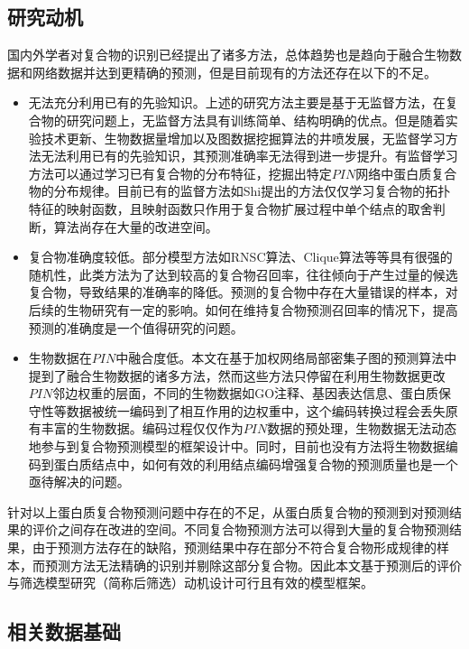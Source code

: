 \subsection{研究动机}
\label{subsection:motivationAndThinking:motivation}
国内外学者对复合物的识别已经提出了诸多方法，总体趋势也是趋向于融合生物数据和网络数据并达到更精确的预测，但是目前现有的方法还存在以下的不足。
\begin{itemize}
  \item 无法充分利用已有的先验知识。上述的研究方法主要是基于无监督方法，在复合物的研究问题上，无监督方法具有训练简单、结构明确的优点。但是随着实验技术更新、生物数据量增加以及图数据挖掘算法的井喷发展，无监督学习方法无法利用已有的先验知识，其预测准确率无法得到进一步提升。有监督学习方法可以通过学习已有复合物的分布特征，挖掘出特定$PIN$网络中蛋白质复合物的分布规律。目前已有的监督方法如Shi提出的方法\cite{shi_protein_2011}仅仅学习复合物的拓扑特征的映射函数，且映射函数只作用于复合物扩展过程中单个结点的取舍判断，算法尚存在大量的改进空间。

  \item 复合物准确度较低。部分模型方法如RNSC算法\cite{king_protein_2004}、Clique算法\cite{spirin_protein_2003}等等具有很强的随机性，此类方法为了达到较高的复合物召回率，往往倾向于产生过量的候选复合物，导致结果的准确率的降低。预测的复合物中存在大量错误的样本，对后续的生物研究有一定的影响。如何在维持复合物预测召回率的情况下，提高预测的准确度是一个值得研究的问题。

  \item 生物数据在$PIN$中融合度低。本文在基于加权网络局部密集子图的预测算法中提到了融合生物数据的诸多方法，然而这些方法只停留在利用生物数据更改$PIN$邻边权重的层面，不同的生物数据如GO注释、基因表达信息、蛋白质保守性等数据被统一编码到了相互作用的边权重中，这个编码转换过程会丢失原有丰富的生物数据。编码过程仅仅作为$PIN$数据的预处理，生物数据无法动态地参与到复合物预测模型的框架设计中。同时，目前也没有方法将生物数据编码到蛋白质结点中，如何有效的利用结点编码增强复合物的预测质量也是一个亟待解决的问题。
\end{itemize}

针对以上蛋白质复合物预测问题中存在的不足，从蛋白质复合物的预测到对预测结果的评价之间存在改进的空间。不同复合物预测方法可以得到大量的复合物预测结果，由于预测方法存在的缺陷，预测结果中存在部分不符合复合物形成规律的样本，而预测方法无法精确的识别并剔除这部分复合物。因此本文基于预测后的评价与筛选模型研究（简称后筛选）动机设计可行且有效的模型框架。

\subsection{相关数据基础}
\label{subsection:motivationAndThinking:datasubstructure}

